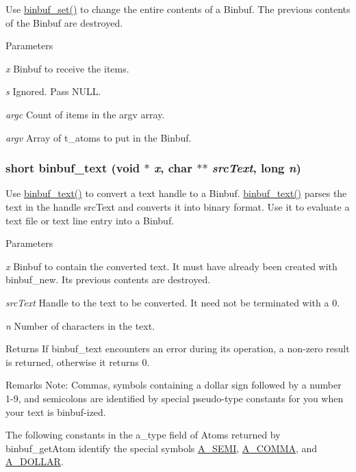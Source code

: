 Use \hyperlink{group__binbuf_ga716d66a159b96b7b9d87baaab33367e0}{binbuf\_\-set()} to change the entire contents of a Binbuf. The previous contents of the Binbuf are destroyed.


\begin{DoxyParams}{Parameters}
\item[{\em x}]Binbuf to receive the items. \item[{\em s}]Ignored. Pass NULL. \item[{\em argc}]Count of items in the argv array. \item[{\em argv}]Array of t\_\-atoms to put in the Binbuf. \end{DoxyParams}
\hypertarget{group__binbuf_ga7a582c876ee074505762b30c7eef6504}{
\subsubsection[{binbuf\_\-text}]{\setlength{\rightskip}{0pt plus 5cm}short binbuf\_\-text (void $\ast$ {\em x}, \/  char $\ast$$\ast$ {\em srcText}, \/  long {\em n})}}
\label{group__binbuf_ga7a582c876ee074505762b30c7eef6504}


Use \hyperlink{group__binbuf_ga7a582c876ee074505762b30c7eef6504}{binbuf\_\-text()} to convert a text handle to a Binbuf. \hyperlink{group__binbuf_ga7a582c876ee074505762b30c7eef6504}{binbuf\_\-text()} parses the text in the handle srcText and converts it into binary format. Use it to evaluate a text file or text line entry into a Binbuf.


\begin{DoxyParams}{Parameters}
\item[{\em x}]Binbuf to contain the converted text. It must have already been created with binbuf\_\-new. Its previous contents are destroyed. \item[{\em srcText}]Handle to the text to be converted. It need not be terminated with a 0. \item[{\em n}]Number of characters in the text. \end{DoxyParams}
\begin{DoxyReturn}{Returns}
If binbuf\_\-text encounters an error during its operation, a non-\/zero result is returned, otherwise it returns 0.
\end{DoxyReturn}
\begin{DoxyRemark}{Remarks}
Note: Commas, symbols containing a dollar sign followed by a number 1-\/9, and semicolons are identified by special pseudo-\/type constants for you when your text is binbuf-\/ized.
\end{DoxyRemark}
The following constants in the a\_\-type field of Atoms returned by binbuf\_\-getAtom identify the special symbols \hyperlink{group__atom_gga8aa6700e9f00b132eb376db6e39ade47ac105be4ef726ee36c4330e16bb24706e}{A\_\-SEMI}, \hyperlink{group__atom_gga8aa6700e9f00b132eb376db6e39ade47a07c3484085a3217107acec059d17b945}{A\_\-COMMA}, and \hyperlink{group__atom_gga8aa6700e9f00b132eb376db6e39ade47af0a5a9017f6b59e82a4859cd0560d36b}{A\_\-DOLLAR}.


